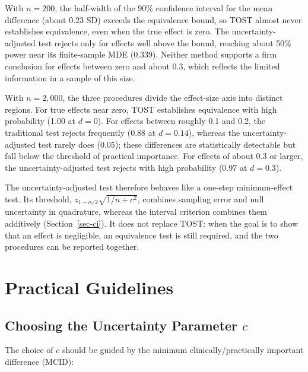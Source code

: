\documentclass[
  11pt,
  letterpaper,
]{article}
\begin{document}
With \(n = 200\), the half-width of the 90\% confidence interval for the
mean difference (about 0.23 SD) exceeds the equivalence bound, so TOST
almost never establishes equivalence, even when the true effect is zero.
The uncertainty-adjusted test rejects only for effects well above the
bound, reaching about 50\% power near its finite-sample MDE (0.339).
Neither method supports a firm conclusion for effects between zero and
about 0.3, which reflects the limited information in a sample of this
size.

With \(n = 2{,}000\), the three procedures divide the effect-size axis
into distinct regions. For true effects near zero, TOST establishes
equivalence with high probability (1.00 at \(d = 0\)). For effects
between roughly 0.1 and 0.2, the traditional test rejects frequently
(0.88 at \(d = 0.14\)), whereas the uncertainty-adjusted test rarely
does (0.05); these differences are statistically detectable but fall
below the threshold of practical importance. For effects of about 0.3 or
larger, the uncertainty-adjusted test rejects with high probability
(0.97 at \(d = 0.3\)).

The uncertainty-adjusted test therefore behaves like a one-step
minimum-effect test. Its threshold, \(z_{1-\alpha/2}\sqrt{1/n + c^2}\),
combines sampling error and null uncertainty in quadrature, whereas the
interval criterion combines them additively (Section~\ref{sec-ci}). It
does not replace TOST: when the goal is to show that an effect is
negligible, an equivalence test is still required, and the two
procedures can be reported together.

\section{Practical Guidelines}\label{sec-guidelines}

\subsection{\texorpdfstring{Choosing the Uncertainty Parameter
\(c\)}{Choosing the Uncertainty Parameter c}}\label{choosing-the-uncertainty-parameter-c}

The choice of \(c\) should be guided by the minimum
clinically/practically important difference (MCID):
\end{document}
